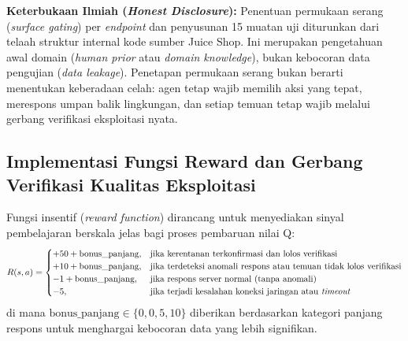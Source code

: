 \textbf{Keterbukaan Ilmiah (\textit{Honest Disclosure}):} Penentuan permukaan serang (\textit{surface gating}) per \textit{endpoint} dan penyusunan 15 muatan uji diturunkan dari telaah struktur internal kode sumber Juice Shop. Ini merupakan pengetahuan awal domain (\textit{human prior} atau \textit{domain knowledge}), bukan kebocoran data pengujian (\textit{data leakage}). Penetapan permukaan serang bukan berarti menentukan keberadaan celah: agen tetap wajib memilih aksi yang tepat, merespons umpan balik lingkungan, dan setiap temuan tetap wajib melalui gerbang verifikasi eksploitasi nyata.


\subsection{Implementasi Fungsi Reward dan Gerbang Verifikasi Kualitas Eksploitasi}

Fungsi insentif (\textit{reward function}) dirancang untuk menyediakan sinyal pembelajaran berskala jelas bagi proses pembaruan nilai Q:
\begin{equation}
R(s, a) = 
\begin{cases}
+50 + \text{bonus\_panjang}, & \text{jika kerentanan terkonfirmasi dan lolos verifikasi} \\
+10 + \text{bonus\_panjang}, & \text{jika terdeteksi anomali respons atau temuan tidak lolos verifikasi} \\
-1 + \text{bonus\_panjang},  & \text{jika respons server normal (tanpa anomali)} \\
-5,                          & \text{jika terjadi kesalahan koneksi jaringan atau \textit{timeout}}
\end{cases}
\end{equation}
di mana $\text{bonus\_panjang} \in \{0, 0, 5, 10\}$ diberikan berdasarkan kategori panjang respons untuk menghargai kebocoran data yang lebih signifikan.

